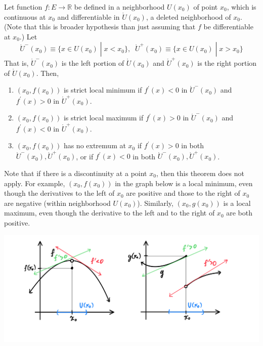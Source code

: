   \begin{theorem}
  Let function $f: E \longrightarrow \mathbb{R}$ be defined in a neighborhood $U(x_0)$ of point $x_0$, which is continuous at $x_0$ and differentiable in $\mathring{U}(x_0)$, a deleted neighborhood of $x_0$. (Note that this is broader hypothesis than just assuming that $f$ be differentiable at $x_0$.) Let
  \[\mathring{U}^- (x_0) \equiv \{x \in U(x_0) \;|\; x < x_0\}, \;\; \mathring{U}^+ (x_0) \equiv \{x \in U(x_0) \;|\; x > x_0\}\]
  That is, $\mathring{U}^- (x_0)$ is the left portion of $\mathring{U}(x_0)$ and $\mathring{U}^+ (x_0)$ is the right portion of $\mathring{U}(x_0)$. Then, 
  \begin{enumerate}
    \item $(x_0, f(x_0))$ is strict local minimum if $f^\prime(x) < 0$ in $\mathring{U}^- (x_0)$ and $f^\prime (x) > 0$ in $\mathring{U}^+ (x_0)$. 

    \item $(x_0, f(x_0))$ is strict local maximum if $f^\prime(x) > 0$ in $\mathring{U}^- (x_0)$ and $f^\prime (x) < 0$ in $\mathring{U}^+ (x_0)$. 

    \item $(x_0, f(x_0))$ has no extremum at $x_0$ if $f^\prime (x) > 0$ in both $\mathring{U}^- (x_0), \mathring{U}^+ (x_0)$, or if $f^\prime(x)< 0$ in both $\mathring{U}^- (x_0), \mathring{U}^+ (x_0)$. 
  \end{enumerate}
  \end{theorem}

  Note that if there is a discontinuity at a point $x_0$, then this theorem does not apply. For example, $(x_0, f(x_0))$ in the graph below is a local minimum, even though the derivatives to the left of $x_0$ are positive and those to the right of $x_0$ are negative (within neighborhood $U(x_0)$). Similarly, $(x_0, g(x_0))$ is a local maximum, even though the derivative to the left and to the right of $x_0$ are both positive. 
  \begin{center}
      \includegraphics[scale=0.3]{img/Theorem_not_apply_if_Discontinuity.PNG}
  \end{center}

